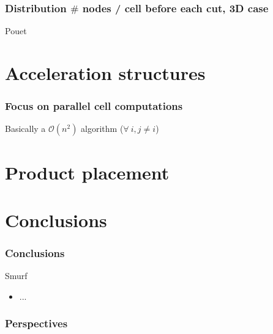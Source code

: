 \documentclass[aspectratio=169]{beamer}
\begin{document}
\begin{frame}
    \frametitle{Distribution $\#$ nodes / cell before each cut, 3D case}
    \begin{center}
        
    \end{center}

    \vfill
    Pouet
\end{frame}


\section{Acceleration structures}

\begin{frame}
    \frametitle{Focus on parallel cell computations}

    Basically a $\mathcal{O}( n^2 )$ algorithm ($\forall\ i, j \neq i$)
    
    
\end{frame}


\section{Product placement}


\section{Conclusions}

\begin{frame}
    \frametitle{Conclusions}

    Smurf
    \begin{itemize}
        \item ...
    \end{itemize}
    
    \vfill
\end{frame}


\begin{frame}
    \frametitle{Perspectives}

\end{frame}
\end{document}
